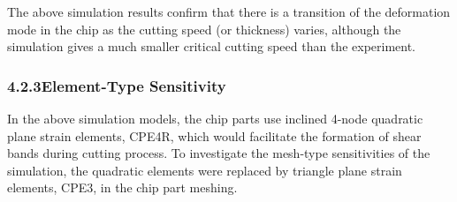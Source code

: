\documentclass{article}
\begin{document}

The above simulation results confirm that there is a transition of the deformation mode in the chip as the cutting speed (or thickness) varies, although the simulation gives a much smaller critical cutting speed than the experiment.

\subsubsection*{4.2.3\quad Element-Type Sensitivity}

In the above simulation models, the chip parts use inclined 4-node quadratic plane strain elements, CPE4R, which would facilitate the formation of shear bands during cutting process. To investigate the mesh-type sensitivities of the simulation, the quadratic elements were replaced by triangle plane strain elements, CPE3, in the chip part meshing.
\end{document}
